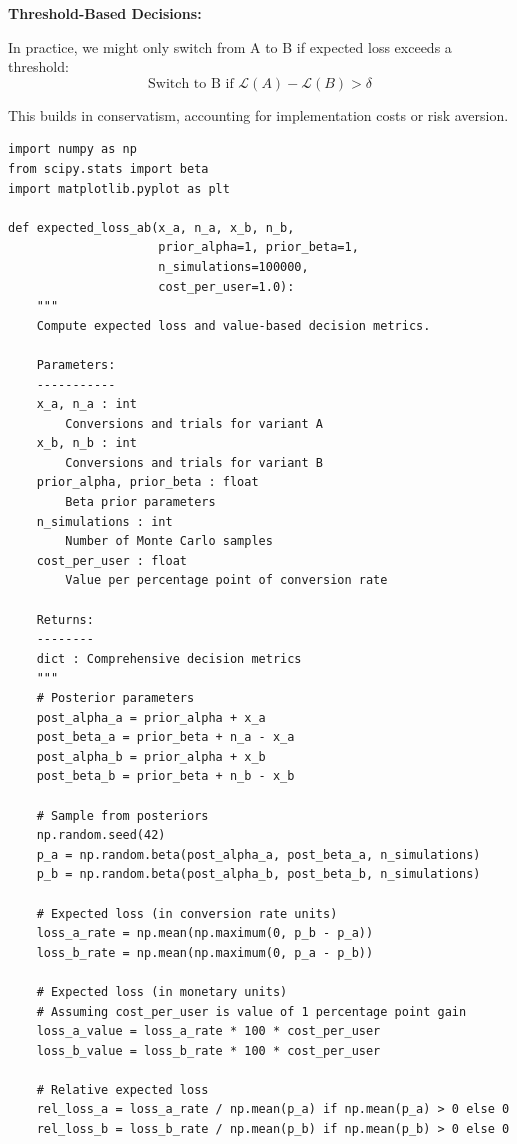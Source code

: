 \textbf{Threshold-Based Decisions:}

In practice, we might only switch from A to B if expected loss exceeds a threshold:
\begin{equation}
\text{Switch to B if } \mathcal{L}(A) - \mathcal{L}(B) > \delta
\end{equation}

This builds in conservatism, accounting for implementation costs or risk aversion.

\lstset{language=Python, caption=Expected Loss and Value of Information}
\begin{lstlisting}
import numpy as np
from scipy.stats import beta
import matplotlib.pyplot as plt

def expected_loss_ab(x_a, n_a, x_b, n_b,
                     prior_alpha=1, prior_beta=1,
                     n_simulations=100000,
                     cost_per_user=1.0):
    """
    Compute expected loss and value-based decision metrics.

    Parameters:
    -----------
    x_a, n_a : int
        Conversions and trials for variant A
    x_b, n_b : int
        Conversions and trials for variant B
    prior_alpha, prior_beta : float
        Beta prior parameters
    n_simulations : int
        Number of Monte Carlo samples
    cost_per_user : float
        Value per percentage point of conversion rate

    Returns:
    --------
    dict : Comprehensive decision metrics
    """
    # Posterior parameters
    post_alpha_a = prior_alpha + x_a
    post_beta_a = prior_beta + n_a - x_a
    post_alpha_b = prior_alpha + x_b
    post_beta_b = prior_beta + n_b - x_b

    # Sample from posteriors
    np.random.seed(42)
    p_a = np.random.beta(post_alpha_a, post_beta_a, n_simulations)
    p_b = np.random.beta(post_alpha_b, post_beta_b, n_simulations)

    # Expected loss (in conversion rate units)
    loss_a_rate = np.mean(np.maximum(0, p_b - p_a))
    loss_b_rate = np.mean(np.maximum(0, p_a - p_b))

    # Expected loss (in monetary units)
    # Assuming cost_per_user is value of 1 percentage point gain
    loss_a_value = loss_a_rate * 100 * cost_per_user
    loss_b_value = loss_b_rate * 100 * cost_per_user

    # Relative expected loss
    rel_loss_a = loss_a_rate / np.mean(p_a) if np.mean(p_a) > 0 else 0
    rel_loss_b = loss_b_rate / np.mean(p_b) if np.mean(p_b) > 0 else 0


\end{lstlisting}
